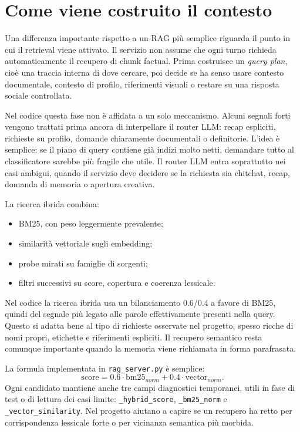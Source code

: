 \section{Come viene costruito il contesto}
Una differenza importante rispetto a un RAG più semplice riguarda il punto in cui il retrieval viene attivato. Il servizio non assume che ogni turno richieda automaticamente il recupero di chunk factual. Prima costruisce un \emph{query plan}, cioè una traccia interna di dove cercare, poi decide se ha senso usare contesto documentale, contesto di profilo, riferimenti visuali o restare su una risposta sociale controllata.

Nel codice questa fase non è affidata a un solo meccanismo. Alcuni segnali forti vengono trattati prima ancora di interpellare il router LLM: recap espliciti, richieste su profilo, domande chiaramente documentali o definitorie. L'idea è semplice: se il piano di query contiene già indizi molto netti, demandare tutto al classificatore sarebbe più fragile che utile. Il router LLM entra soprattutto nei casi ambigui, quando il servizio deve decidere se la richiesta sia chitchat, recap, domanda di memoria o apertura creativa.

La ricerca ibrida combina:
\begin{itemize}
\item BM25, con peso leggermente prevalente;
\item similarità vettoriale sugli embedding;
\item probe mirati su famiglie di sorgenti;
\item filtri successivi su score, copertura e coerenza lessicale.
\end{itemize}

Nel codice la ricerca ibrida usa un bilanciamento 0.6/0.4 a favore di BM25, quindi del segnale più legato alle parole effettivamente presenti nella query. Questo si adatta bene al tipo di richieste osservate nel progetto, spesso ricche di nomi propri, etichette e riferimenti espliciti. Il recupero semantico resta comunque importante quando la memoria viene richiamata in forma parafrasata.

La formula implementata in \texttt{rag\_server.py} è semplice:
\[
\mathrm{score} = 0.6 \cdot \mathrm{bm25}_{norm} + 0.4 \cdot \mathrm{vector}_{norm}.
\]
\sloppy Ogni candidato mantiene anche tre campi diagnostici temporanei, utili in fase di test o di lettura dei casi limite: \texttt{\_hybrid\_score}, \texttt{\_bm25\_norm} e \texttt{\_vector\_similarity}. Nel progetto aiutano a capire se un recupero ha retto per corrispondenza lessicale forte o per vicinanza semantica più morbida.

